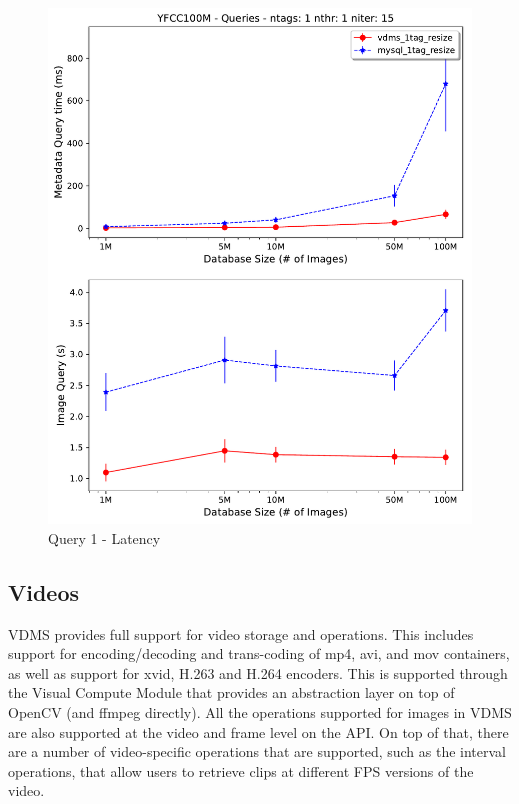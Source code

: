 \begin{figure}[]
\centering
\includegraphics[width=\columnwidth]{figures/q1_latency}
\caption{Query 1 - Latency}
\label{fig:q1_latency}
\end{figure}



\subsection{Videos}
\label{videos}

VDMS provides full support for video storage and operations.
This includes support for encoding/decoding and trans-coding of mp4, avi, and
mov containers, as well as support for xvid, H.263 and H.264 encoders.
This is supported through the Visual Compute Module that provides an abstraction
layer on top of OpenCV (and ffmpeg directly).
All the operations supported for images in VDMS are also supported at the
video and frame level on the API. On top of that, there are a number of
video-specific operations that are supported, such as the interval operations,
that allow users to retrieve clips at different FPS versions of the video.

